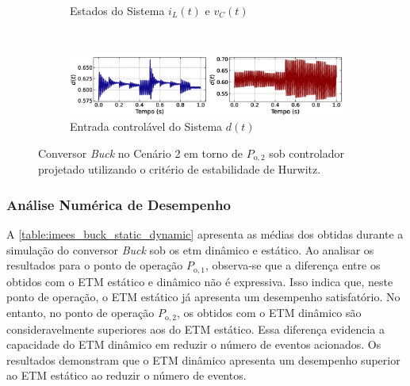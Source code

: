 \begin{figure}[H]
\begin{subfigure}{1.\textwidth}
    \caption{Estados do Sistema $i_L(t)$  e $v_C(t)$}
  \end{subfigure}
  \\[6pt]
  \begin{subfigure}{1.\textwidth}
    \centering
    \includegraphics[width=1.\textwidth]{figuras/classic/buck/sim2/op2/duty-cycle.eps}
    \caption{Entrada controlável do Sistema $d(t)$}
  \end{subfigure}
  \caption{Conversor \textit{Buck} no Cenário 2 em torno de $P_{\mathrm{o}, 2}$ sob controlador projetado utilizando o critério de estabilidade de Hurwitz.}
  \label{fig:classic_buck_cen2_op2}
\end{figure}


\subsubsection{Análise Numérica de Desempenho}

A \autoref{table:imees_buck_static_dynamic} apresenta as médias dos  obtidas durante a simulação do conversor \textit{Buck} sob os \acrshort{etm} dinâmico e estático. Ao analisar os resultados para o ponto de operação $P_{\mathrm{o}, 1}$, observa-se que a diferença entre os  obtidos com o ETM estático e dinâmico não é expressiva. Isso indica que, neste ponto de operação, o ETM estático já apresenta um desempenho satisfatório. No entanto, no ponto de operação $P_{\mathrm{o}, 2}$, os  obtidos com o ETM dinâmico são consideravelmente superiores aos do ETM estático. Essa diferença evidencia a capacidade do ETM dinâmico em reduzir o número de eventos acionados. Os resultados demonstram que o ETM dinâmico apresenta um desempenho superior ao ETM estático ao reduzir o número de eventos.

